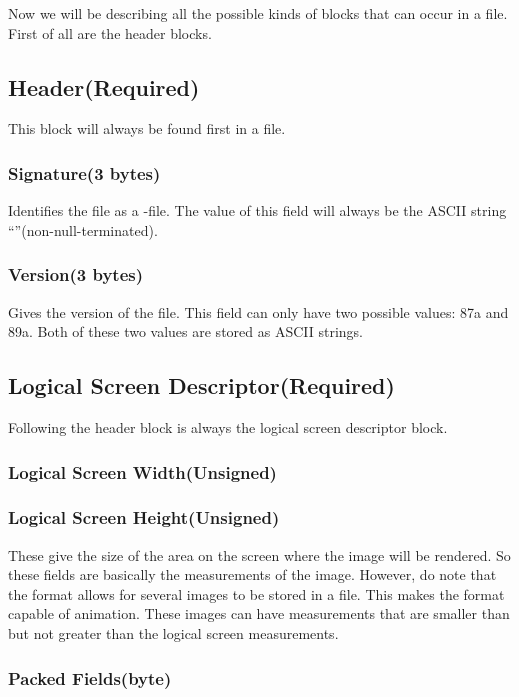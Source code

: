 Now we will be describing all the possible kinds of blocks that can
occur in a \gif file. First of all are the header blocks.

\subsection{Header(Required)}

This block will always be found first in a \gif file.

\subsubsection*{Signature(3 bytes)}

Identifies the file as a \gif-file. The value of this field will always
be the ASCII string ``\gif''(non-null-terminated).

\subsubsection{Version(3 bytes)}

Gives the version of the \gif file. This field can only have two
possible values: 87a and 89a. Both of these two values are stored as
ASCII strings.

\subsection{Logical Screen Descriptor(Required)}

Following the header block is always the logical screen descriptor
block.

\subsubsection{Logical Screen Width(Unsigned)}
\subsubsection{Logical Screen Height(Unsigned)}

These give the size of the area on the screen where the image will be
rendered. So these fields are basically the measurements of the
image. However, do note that the \gif format allows for several images
to be stored in a \gif file. This makes the \gif format capable of
animation. These images can have measurements that are smaller than
but not greater than the logical screen measurements.

\subsubsection{Packed Fields(byte)}

